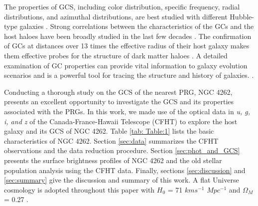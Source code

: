 \documentclass[fleqn,usenatbib]{mnras}
\begin{document}
The properties of GCS, including color distribution, specific frequency, radial distributions, and azimuthal distributions, are best studied with different Hubble-type galaxies \citep[e.g.][]{2004Rhodeandzepf,2011Hargis,2011forbe,2012Blom,sreeja2014,2018Sesto,Beasley2020rfma.book..245B,2022Buzzosplus,2023harris,2024Caso}. Strong correlations between the characteristics of the GCs and the host haloes have been broadly studied in the last few decades \citep[references therein]{2008peng,2015Harris_hudson,2017Forbes,2022Reina}. The confirmation of GCs at distances over 13 times the effective radius of their host galaxy makes them effective probes for the structure of dark matter haloes \citep{2016Alabi}. A detailed examination of GC properties can provide vital information to galaxy evolution scenarios and is a powerful tool for tracing the structure and history of galaxies. \citep{forbed1997,2brodieandstrader006ARA&A..44..193B,2019Kruijssen,Beasley2020rfma.book..245B}. \par

Conducting a thorough study on the GCS of the nearest PRG, NGC 4262, presents an excellent opportunity to investigate the GCS and its properties associated with the PRGs. In this work, we made use of the optical data in {\it u, g, i, and z } of the Canada-France-Hawaii Telescope (CFHT) to explore the host galaxy and its GCS of NGC 4262. Table \ref{tab: Table:1} lists the basic characteristics of NGC 4262. Section \ref{sec:data} summarizes the CFHT observations and the data reduction procedure. Section \ref{sec:phot_and_GCS} presents the surface brightness profiles of NGC 4262 and the old stellar population analysis using the CFHT data. Finally, sections \ref{sec:discussion} and \ref{sec:summary} give the discussion and summary of this work.
A flat Universe cosmology is adopted throughout this paper with $H_{0}$ = 71 $kms^{−1}$ $Mpc^{−1}$ and $\Omega_M$ = 0.27 \citep{2011Komatsu}.
\end{document}
